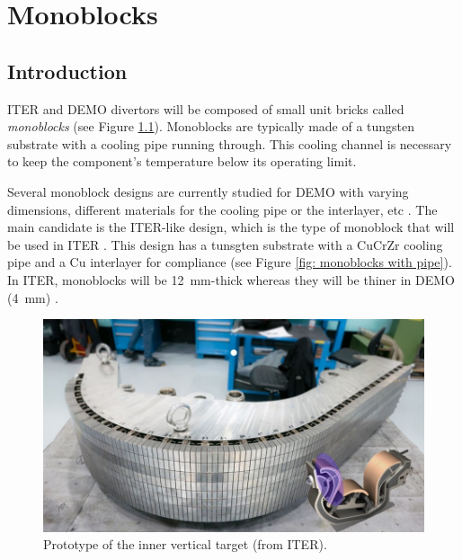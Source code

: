 \setchapterpreamble[u]{\margintoc}
\chapter{Monoblocks}

\section{Introduction}
ITER and DEMO divertors will be composed of small unit bricks called \textit{monoblocks} (see Figure \ref{fig: inner target photo}).
Monoblocks are typically made of a tungsten substrate with a cooling pipe running through.
This cooling channel is necessary to keep the component's temperature below its operating limit.

Several monoblock designs are currently studied for DEMO with varying dimensions, different materials for the cooling pipe or the interlayer, etc .
The main candidate is the ITER-like design, which is the type of monoblock that will be used in ITER \cite{hirai_use_2016}.
This design has a tunsgten substrate with a CuCrZr cooling pipe and a Cu interlayer for compliance (see Figure \ref{fig: monoblocks with pipe}).
In ITER, monoblocks will be \SI{12}{mm}-thick whereas they will be thiner in DEMO (\SI{4}{mm}) .

\begin{figure}
    \centering
    \includegraphics[width=\linewidth]{Figures/Chapter3/inner_target_iter.jpg}
    \caption{Prototype of the inner vertical target (from ITER).}
    \label{fig: inner target photo}
\end{figure}

